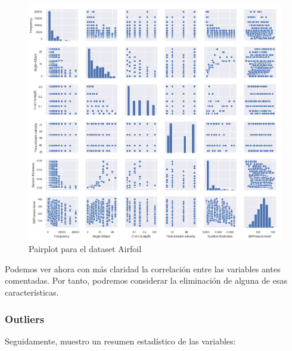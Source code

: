\begin{figure}[H] %
	\centering
	\includegraphics[scale=0.6]{pairplot-air.png}  %
	\caption{Pairplot para el dataset Airfoil} 
	\label{fig:pairplot-air}
\end{figure}

Podemos ver ahora con más claridad la correlación entre las variables antes comentadas. Por tanto, podremos considerar la eliminación de alguna de esas características.
\newpage
\subsubsection{Outliers}

Seguidamente, muestro un resumen estadístico de las variables:

